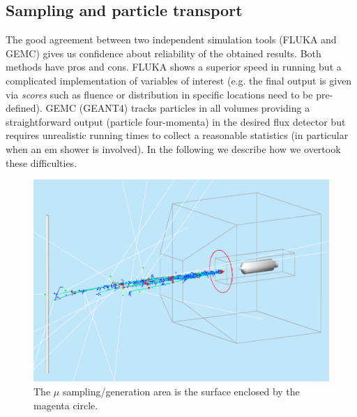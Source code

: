 \subsection{Sampling  and particle transport}\label{sec:sampling}
The good agreement between two independent simulation tools (FLUKA and GEMC)  gives us confidence about reliability of the obtained results. Both methods have pros and cons. FLUKA shows a superior speed in running but a complicated implementation of  variables of interest  (e.g. the final output is given via {\it scores} such as fluence or distribution in specific locations  need to be pre-defined). GEMC (GEANT4) tracks particles in all volumes providing a straightforward  output (particle four-momenta) in the desired flux detector but requires unrealistic running times to collect a reasonable statistics (in particular when an em shower is involved). In the following we describe how we overtook these difficulties.
\begin{figure}[h!] 
\center
\includegraphics[width=12cm]{figs/mu-gen.pdf}   
\caption{The  $\mu$ sampling/generation area is the surface enclosed by  the magenta circle.}
\label{fig:mu-gen}
\end{figure}

